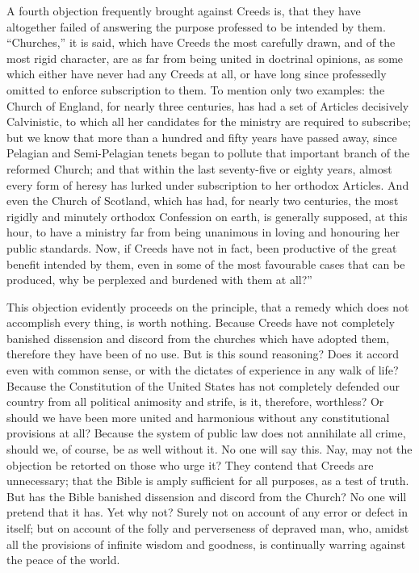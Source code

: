 \documentclass[
]{book}
\begin{document}
A fourth objection frequently brought against Creeds is, that they have altogether failed of answering the purpose professed to be intended by them. ``Churches,'' it is said, which have Creeds the most carefully drawn, and of the most rigid character, are as far from being united in doctrinal opinions, as some which either have never had any Creeds at all, or have long since professedly omitted to enforce subscription to them. To mention only two examples: the Church of England, for nearly three centuries, has had a set of Articles decisively Calvinistic, to which all her candidates for the ministry are required to subscribe; but we know that more than a hundred and fifty years have passed away, since Pelagian and Semi-Pelagian tenets began to pollute that important branch of the reformed Church; and that within the last seventy-five or eighty years, almost every form of heresy has lurked under subscription to her orthodox Articles. And even the Church of Scotland, which has had, for nearly two centuries, the most rigidly and minutely orthodox Confession on earth, is generally supposed, at this hour, to have a ministry far from being unanimous in loving and honouring her public standards. Now, if Creeds have not in fact, been productive of the great benefit intended by them, even in some of the most favourable cases that can be produced, why be perplexed and burdened with them at all?''

This objection evidently proceeds on the principle, that a remedy which does not accomplish every thing, is worth nothing. Because Creeds have not completely banished dissension and discord from the churches which have adopted them, therefore they have been of no use. But is this sound reasoning? Does it accord even with common sense, or with the dictates of experience in any walk of life? Because the Constitution of the United States has not completely defended our country from all political animosity and strife, is it, therefore, worthless? Or should we have been more united and harmonious without any constitutional provisions at all? Because the system of public law does not annihilate all crime, should we, of course, be as well without it. No one will say this. Nay, may not the objection be retorted on those who urge it? They contend that Creeds are unnecessary; that the Bible is amply sufficient for all purposes, as a test of truth. But has the Bible banished dissension and discord from the Church? No one will pretend that it has. Yet why not? Surely not on account of any error or defect in itself; but on account of the folly and perverseness of depraved man, who, amidst all the provisions of infinite wisdom and goodness, is continually warring against the peace of the world.
\end{document}
